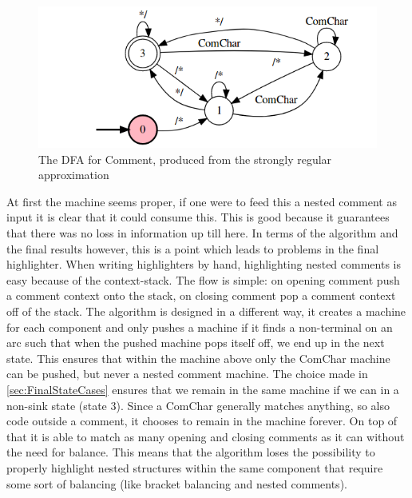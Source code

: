 
\begin{figure}[h!]
	\centering
	\includegraphics[width=\textwidth, keepaspectratio]{Figures/comment_dfa.png}
	\decoRule
 	\caption[DFA for Comment]{The DFA for Comment, produced from the strongly regular approximation}
\end{figure}
At first the machine seems proper, if one were to feed this a nested comment as input it is clear that it could consume this. This is good because it guarantees that there was no loss in information up till here. In terms of the algorithm and the final results however, this is a point which leads to problems in the final highlighter. When writing highlighters by hand, highlighting nested comments is easy because of the context-stack. The flow is simple: on opening comment push a comment context onto the stack, on closing comment pop a comment context off of the stack. The algorithm is designed in a different way, it creates a machine for each component and only pushes a machine if it finds a non-terminal on an arc such that when the pushed machine pops itself off, we end up in the next state. This ensures that within the machine above only the ComChar machine can be pushed, but never a nested comment machine. The choice made in \ref{sec:FinalStateCases} ensures that we remain in the same machine if we can in a non-sink state (state 3). Since a ComChar generally matches anything, so also code outside a comment, it chooses to remain in the machine forever. On top of that it is able to match as many opening and closing comments as it can without the need for balance. This means that the algorithm loses the possibility to properly highlight nested structures within the same component that require some sort of balancing (like bracket balancing and nested comments).

